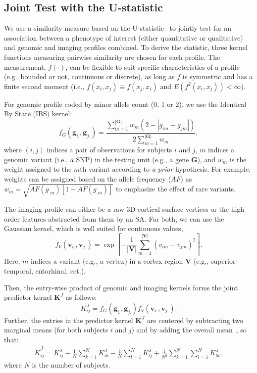 \documentclass[11pt]{article}
\newcommand{\bs}{\boldsymbol}
\begin{document}
\subsection*{Joint Test with the U-statistic}
\newcommand{\vg}{\boldsymbol{g}}
\newcommand{\vv}{\boldsymbol{v}}
We use a similarity measure based on the U-statistic~\citep{UST1, UST2} to jointly test for an association between a phenotype of interest (either quantitative or qualitative) and genomic and imaging profiles combined. To derive the statistic, three kernel functions measuring pairwise similarity are chosen for each profile. The measurement, $f(\cdot)$, can be flexible to suit specific characteristics of a profile (e.g.\ bounded or not, continuous or discrete), as long as $f$ is symmetric and has a finite second moment (i.e., $f(x_i,x_j) \equiv f(x_j,x_i)$ and $E(f^2(x_i, x_j))<\infty$).

For genomic profile coded by minor allele count (0, 1 or 2), we use the Identical By State (IBS) kernel:
\label{eq:wSG}
\[ f_G(\vg_{i.}, \vg_{j.}) = \frac{\sum_{m=1}^{|\bs{G}|}{w_m(2 - |g_{im} - g_{jm}|)}} {2\sum_{m=1}^{|\bs{G}|}{w_m}}, \]
where $(i,j)$ indices a pair of observations for subjects $i$ and $j$, $m$ indices a genomic variant (i.e., a SNP) in the testing unit (e.g., a gene $\bs{G}$), and $w_m$ is the weight assigned to the $m$th variant according to \textit{a prior} hypothesis. For example, weights can be assigned based on the allele frequency ($AF$) as $w_m=\sqrt{AF(g_{.m})[1-AF(g_{.m})]}$ to emphasize the effect of rare variants.

The imaging profile can either be a raw 3D cortical surface vertices or the high order features abstracted from them by an SA. For both, we can use the Gaussian kernel, which is well suited for continuous values,
\label{eq:wSV}
\[ f_V(\vv_{i.},\vv_{j.}) = \exp{\left[-\frac{1}{|\bs{V}|} \sum_{m=1}^{|\bs{V}|}{(v_{im}-v_{jm})^2} \right]}. \]
Here, $m$ indices a variant  (e.g., a vertex) in a cortex region $\bs{V}$ (e.g., superior-temporal, entorhinal, ect.). 

Then, the entry-wise product of genomic and imaging kernels forms the joint predictor kernel $\bs{K}^J$ as follows:
\[ K_{ij}^J = f_G(\vg_{i.}, \vg_{j.}) f_V(\vv_{i.}, \vv_{j.}).\]
Further, the entries in the predictor kernel $\bs{K}^J$ are centered by subtracting two marginal means (for both subjects $i$ and $j$) and by adding the overall mean~\citep{UST2}, so that:
\begin{align*}
  \tilde{K}_{ij}^J = K_{ij}^J -\frac{1}{N} \sum_{k=1}^N{K_{ik}^J}-\frac{1}{N}\sum_{l=1}^N{K_{lj}^J} + \frac{1}{N^2} \sum_{k=1}^{N} \sum_{l=1}^{N} {K_{lk}^J},
\end{align*}
where $N$ is the number of subjects. 
\end{document}
